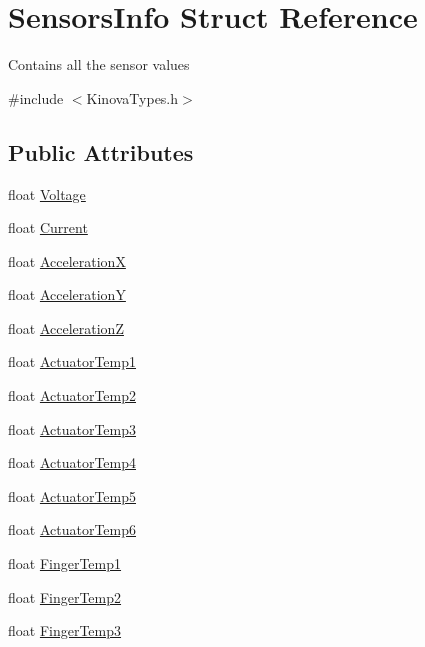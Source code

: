 \hypertarget{struct_sensors_info}{\section{Sensors\-Info Struct Reference}
\label{struct_sensors_info}
}


\par
Contains all the sensor values  




{\ttfamily \#include $<$Kinova\-Types.\-h$>$}

\subsection*{Public Attributes}
\begin{DoxyCompactItemize}
\item 
float \hyperlink{struct_sensors_info_a9ced23ff499026d028b2179945091775}{Voltage}
\item 
float \hyperlink{struct_sensors_info_a2be7e431dce5a2093e6f61a7333b574c}{Current}
\item 
float \hyperlink{struct_sensors_info_a3d4a04448cbb350ce537758ec9c38e51}{Acceleration\-X}
\item 
float \hyperlink{struct_sensors_info_af8316a86022a11ef16181d5cbc6e266e}{Acceleration\-Y}
\item 
float \hyperlink{struct_sensors_info_a98074de49d42dbb1b303e5e68e03cc90}{Acceleration\-Z}
\item 
float \hyperlink{struct_sensors_info_a9aa0da9e61455fd8b3faa91ad5970985}{Actuator\-Temp1}
\item 
float \hyperlink{struct_sensors_info_abf182850e94b2bab72a282eb2a76be75}{Actuator\-Temp2}
\item 
float \hyperlink{struct_sensors_info_aae8cdcf3e2412f99ec5cdc5a13db1528}{Actuator\-Temp3}
\item 
float \hyperlink{struct_sensors_info_a69bb9fe27b7e18a1c09da9135a13c324}{Actuator\-Temp4}
\item 
float \hyperlink{struct_sensors_info_a03c089c08df66cc62b0aa768557e2128}{Actuator\-Temp5}
\item 
float \hyperlink{struct_sensors_info_aa22bb78967dc3b480280c422613f8382}{Actuator\-Temp6}
\item 
float \hyperlink{struct_sensors_info_a752833e7fba2c791ecf2693b96cff3d0}{Finger\-Temp1}
\item 
float \hyperlink{struct_sensors_info_a97f570d85f99948f785551712da25145}{Finger\-Temp2}
\item 
float \hyperlink{struct_sensors_info_ad18fa2c352189db0a8aff1d38c1c7b52}{Finger\-Temp3}
\end{DoxyCompactItemize}


